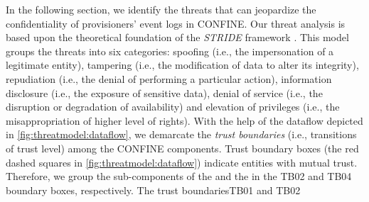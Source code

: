 \begin{newj}
	

In the following section, we identify the threats that can jeopardize the confidentiality of provisioners' event logs in CONFINE. Our threat analysis is based upon the theoretical foundation of the \textit{STRIDE} framework \cite{aa}. This model groups the threats into six categories: spoofing (i.e., the impersonation of a legitimate entity), tampering (i.e., the modification of data to alter its integrity), repudiation (i.e., the denial of performing a particular action), information disclosure (i.e., the exposure of sensitive data), denial of service (i.e., the disruption or degradation of availability) and elevation of privileges (i.e., the misappropriation of higher level of rights). With the help of the dataflow depicted in \cref{fig:threatmodel:dataflow}, we demarcate the \textit{trust boundaries} (i.e., transitions of trust level) among the CONFINE components. Trust boundary boxes (the red dashed squares in \cref{fig:threatmodel:dataflow}) indicate entities with mutual trust. Therefore, we group the sub-components of the  and the  in the TB02 and TB04 boundary boxes, respectively. The trust boundariesTB01 and TB02 

\end{newj}


